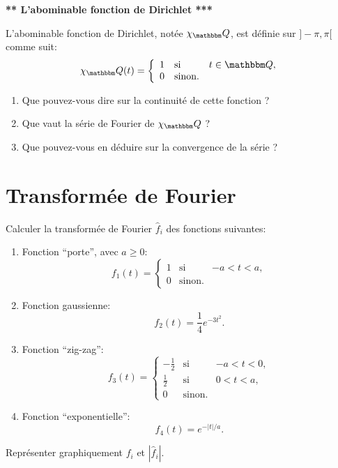 \begin{exercice} 

\begin{center}
{\bf *** L'abominable fonction de Dirichlet ***} 
\end{center}
 
L'abominable fonction de Dirichlet, notée $\chi_\eQ$, est définie sur $]-\pi,\pi[$ comme suit:
\[
  \chi_\eQ(t) = \left \{ \begin{array}{llr} 
  1 & \mbox{si }& t\in \eQ,\\
  0 & \mbox{sinon.}
  \end{array}\right.
\]

\begin{enumerate}
 \item Que pouvez-vous dire sur la continuité de cette fonction ?
 \item Que vaut la série de Fourier de $\chi_\eQ$ ?
 \item Que pouvez-vous en déduire sur la convergence de la série ?
\end{enumerate}

\end{exercice}

\newpage

\section{Transformée de Fourier}

\begin{exercice}

Calculer la transform\'ee de Fourier $\hat{f}_i$ des fonctions suivantes:
\begin{enumerate}
 \item Fonction ``porte'', avec $a \geq 0$:
 \[
  f_1 (t) = \left \{ \begin{array}{llr} 
  1 & \mbox{si }& -a<t<a,\\
  0 & \mbox{sinon.}
  \end{array}\right.
 \]
 \item Fonction gaussienne:
 \[
  f_2(t) = \frac14 e^{-3 t^2}.
 \]
 \item Fonction ``zig-zag'':
 \[
  f_3 (t) = \left \{ \begin{array}{llr} 
  -\frac12 & \mbox{si }& -a<t<0,\\
  \frac12 & \mbox{si }& 0<t<a,\\
  0 & \mbox{sinon.}
  \end{array}\right.
 \]
 \item Fonction ``exponentielle'':
 \[
  f_4 (t) = e^{-|t|/a}.
 \]
\end{enumerate}

Représenter graphiquement $f_i$ et $| \hat{f}_i |$.

\end{exercice}

